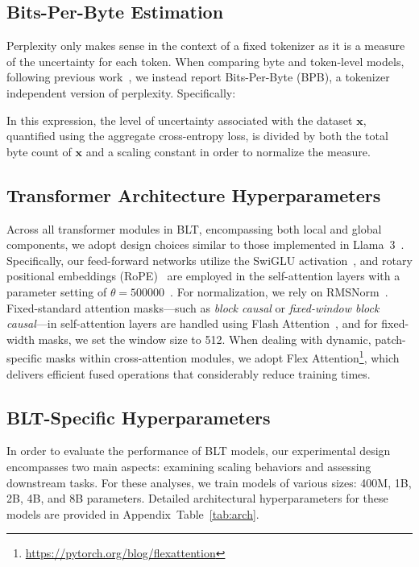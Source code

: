 \subsection{Bits-Per-Byte Estimation} Perplexity only makes sense in the context of a fixed tokenizer as it is a measure of the uncertainty for each token. When comparing byte and token-level models, following previous work~\citep{xue2022byt5, yu2023megabyte, wang2024mambabyte}, we instead report Bits-Per-Byte (BPB), a tokenizer independent version of perplexity. Specifically:

In this expression, the level of uncertainty associated with the dataset $\pmb{x}$, quantified using the aggregate cross-entropy loss, is divided by both the total byte count of $\pmb{x}$ and a scaling constant in order to normalize the measure.

\subsection{Transformer Architecture Hyperparameters}  
Across all transformer modules in {\textsc BLT}, encompassing both local and global components, we adopt design choices similar to those implemented in Llama~3~\citep{dubey2024llama}. Specifically, our feed-forward networks utilize the SwiGLU activation~\citep{swiglu}, and rotary positional embeddings (RoPE)~\citep{RoPe} are employed in the self-attention layers with a parameter setting of $\theta=500000$~\citep{xiong2024effective}. For normalization, we rely on RMSNorm~\citep{RMSNorm}. Fixed-standard attention masks—such as \textit{block causal} or \textit{fixed-window block causal}—in self-attention layers are handled using Flash Attention~\citep{dao2022flashattention}, and for fixed-width masks, we set the window size to 512. When dealing with dynamic, patch-specific masks within cross-attention modules, we adopt Flex Attention\footnote{\url{https://pytorch.org/blog/flexattention}}, which delivers efficient fused operations that considerably reduce training times.

\subsection{{\textsc BLT}-Specific Hyperparameters} In order to evaluate the performance of {\textsc BLT} models, our experimental design encompasses two main aspects: examining scaling behaviors and assessing downstream tasks. For these analyses, we train models of various sizes: 400M, 1B, 2B, 4B, and 8B parameters. Detailed architectural hyperparameters for these models are provided in Appendix~Table~\ref{tab:arch}.

